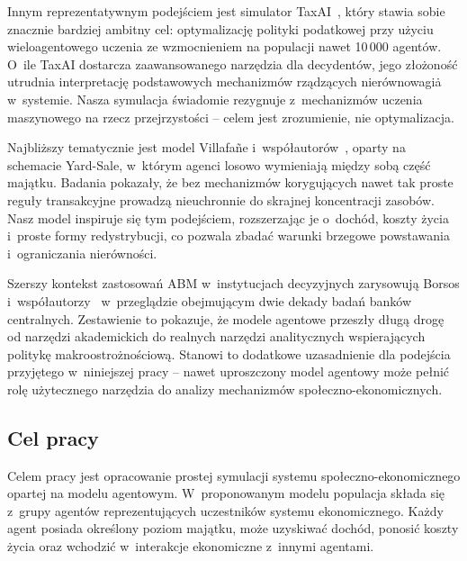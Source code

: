 \documentclass[polish]{projectreport}
\begin{document}
Innym reprezentatywnym podej\'sciem jest simulator TaxAI~\cite{mi2024taxai}, kt\'ory stawia
sobie znacznie bardziej ambitny cel: optymalizacj\k{e} polityki podatkowej przy u\.{z}yciu
wieloagentowego uczenia ze wzmocnieniem na populacji nawet 10\,000 agent\'ow. O~ile
TaxAI dostarcza zaawansowanego narz\k{e}dzia dla decydent\'ow, jego z\l{}o\.{z}ono\'s\'{c}
utrudnia interpretacj\k{e} podstawowych mechanizm\'ow rz\k{a}dz\k{a}cych nierównowagi\.{a} w~systemie.
Nasza symulacja \'swiadomie rezygnuje z~mechanizm\'ow uczenia maszynowego na rzecz
przejrzysto\'sci -- celem jest zrozumienie, nie optymalizacja.

Najbli\.{z}szy tematycznie jest model Villafa\~{n}e i~wsp\'o\l{}autor\'ow~\cite{villafane2025}, oparty
na schemacie Yard-Sale, w~kt\'orym agenci losowo wymieniaj\k{a} mi\k{e}dzy sob\k{a} cz\k{e}\'s\'{c} maj\k{a}tku.
Badania pokaza\l{}y, \.{z}e bez mechanizm\'ow koryguj\k{a}cych nawet tak proste regu\l{}y transakcyjne
prowadz\k{a} nieuchronnie do skrajnej koncentracji zasob\'ow. Nasz model inspiruje si\k{e}
tym podej\'sciem, rozszerzaj\k{a}c je o~doch\'od, koszty \.{z}ycia i~proste formy redystrybucji,
co pozwala zbada\'{c} warunki brzegowe powstawania i~ograniczania nier\'owno\'sci.

Szerszy kontekst zastosowa\'n ABM w~instytucjach decyzyjnych zarysowuj\k{a} Borsos
i~wsp\'o\l{}autorzy~\cite{borsos2025} w~przegl\k{a}dzie obejmuj\k{a}cym dwie dekady bada\'n bank\'ow
centralnych. Zestawienie to pokazuje, \.{z}e modele agentowe przesz\l{}y d\l{}ug\k{a} drog\k{e} od narz\k{e}dzi
akademickich do realnych narz\k{e}dzi analitycznych wspieraj\k{a}cych polityk\k{e} makroostro\.{z}no\'sciow\k{a}.
Stanowi to dodatkowe uzasadnienie dla podej\'scia przyj\k{e}tego w~niniejszej pracy --
nawet uproszczony model agentowy mo\.{z}e pe\l{}ni\'{c} rol\k{e} u\.{z}ytecznego narz\k{e}dzia do analizy
mechanizm\'ow spo\l{}eczno-ekonomicznych.

\subsection{Cel pracy}
\label{sec:goal}

Celem pracy jest opracowanie prostej symulacji systemu spo\l{}eczno-ekonomicznego opartej
na modelu agentowym. W~proponowanym modelu populacja sk\l{}ada si\k{e} z~grupy agent\'ow
reprezentuj\k{a}cych uczestnik\'ow systemu ekonomicznego. Ka\.{z}dy agent posiada okre\'slony
poziom maj\k{a}tku, mo\.{z}e uzyskiwa\'{c} doch\'od, ponosi\'{c} koszty \.{z}ycia oraz wchodzi\'{c}
w~interakcje ekonomiczne z~innymi agentami.
\end{document}
